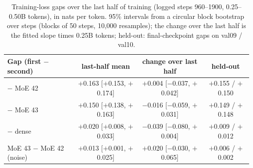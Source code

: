 \begin{table}[ht]
\centering
\caption{Training-loss gaps over the last half of training (logged steps 960--1900, 0.25--0.50B tokens), in nats per token. 95\% intervals from a circular block bootstrap over steps (blocks of 50 steps, 10,000 resamples); the change over the last half is the fitted slope times 0.25B tokens; held-out: final-checkpoint gaps on val09 / val10.}
\label{tab:gap}
\footnotesize
\begin{tabular}{@{}lccc@{}}
\toprule
Gap (first $-$ second) & last-half mean & change over last half & held-out\\
\midrule
\nestor{} $-$ MoE 42 & $+$0.163 [$+$0.153, $+$0.174] & $+$0.004 [$-$0.037, $+$0.042] & $+$0.155 / $+$0.150\\
\nestor{} $-$ MoE 43 & $+$0.150 [$+$0.138, $+$0.163] & $-$0.016 [$-$0.059, $+$0.031] & $+$0.149 / $+$0.148\\
\nestor{} $-$ dense & $+$0.020 [$+$0.008, $+$0.033] & $-$0.039 [$-$0.080, $+$0.004] & $+$0.009 / $+$0.012\\
MoE 43 $-$ MoE 42 (noise) & $+$0.013 [$+$0.001, $+$0.025] & $+$0.020 [$-$0.030, $+$0.065] & $+$0.006 / $+$0.002\\
\bottomrule
\end{tabular}
\end{table}
